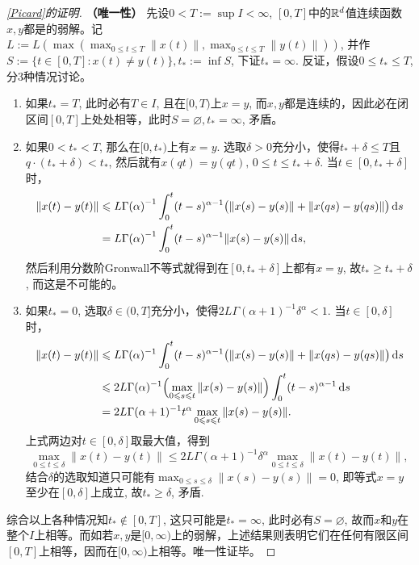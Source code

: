 \begin{proof}[\cref{Picard}的证明]
    \textbf{（唯一性）} 先设$0<T:=\sup I<\infty$, $[0,T]$中的$\mathbb{R}^d$值连续函数$x,y$都是\mainEquation 的弱解。记$L:=L\left(\max\left(\max_{0\leqslant t\leqslant T}\|x(t)\|,\right.\right.\allowbreak\left.\left.\max_{0\leqslant t\leqslant T}\|y(t)\|\right)\right)$, 并作$S:=\{t\in [0,T]\colon x(t)\neq y(t)\},t_*:=\inf S$, 下证$t_*=\infty$. 反证，假设$0\leqslant t_*\leqslant T$, 分3种情况讨论。
    \begin{enumerate}
        \item 如果$t_*=T$, 此时必有$T\in I$, 且在$[0,T)$上$x=y$, 而$x,y$都是连续的，因此必在闭区间$[0,T]$上处处相等，此时$S=\varnothing,t_*=\infty$, 矛盾。
        \item 如果$0<t_*<T$, 那么在$[0,t_*)$上有$x=y$. 选取$\delta>0$充分小，使得$t_*+\delta\leqslant T$且$q\cdot (t_*+\delta)<t_*$, 然后就有$x(qt)=y(qt),\,0\leqslant t\leqslant t_*+\delta$. 当$t\in \left[0,t_*+\delta\right]$时，
        \begin{align*}
            \left\| x(t) - y(t) \right\| &\leqslant {L}{\Gamma(\alpha)}^{-1} \int_0^t (t-s)^{\alpha-1} \bigl(\|x(s)-y(s)\|+\|x(qs)-y(qs)\|\bigr) \mathop{}\!\mathrm{d} s\\
            &={L}{\Gamma(\alpha)}^{-1} \int_0^t (t-s)^{\alpha-1} \|x(s)-y(s)\| \mathop{}\!\mathrm{d} s,
        \end{align*}
        然后利用分数阶Gronwall不等式\cite{mild}就得到在$\left[0,t_*+\delta\right]$上都有$x=y$, 故$t_*\geqslant t_*+\delta$, 而这是不可能的。
        \item 如果$t_*=0$, 选取$\delta\in (0,T]$充分小，使得$2L\Gamma(\alpha+1)^{-1}\delta^\alpha<1$. 当$t\in[0,\delta]$时，
        \begin{align*}
            \left\| x(t) - y(t) \right\| &\leqslant L\Gamma(\alpha)^{-1}\int_0^t (t-s)^{\alpha-1} \bigl(\|x(s)-y(s)\|+\|x(qs)-y(qs)\|\bigr) \mathop{}\!\mathrm{d} s\\
            &\leqslant 2L\Gamma(\alpha)^{-1} \Bigl(\max_{0\leqslant s\leqslant t}\|x(s)-y(s)\|\Bigr) \int_0^t (t-s)^{\alpha-1} \mathop{}\!\mathrm{d} s\\
            &=2L\Gamma(\alpha+1)^{-1}t^\alpha \max_{0\leqslant s\leqslant t}\|x(s)-y(s)\|.
        \end{align*}
        上式两边对$t\in[0,\delta]$取最大值，得到
        \begin{equation*}
            \max_{0\leqslant t\leqslant \delta}\|x(t)-y(t)\|\leqslant 2L\Gamma(\alpha+1)^{-1}\delta^\alpha \max_{0\leqslant t\leqslant \delta}\|x(t)-y(t)\|,
        \end{equation*}
        结合$\delta$的选取知道只可能有$\max_{0\leqslant s\leqslant \delta}\|x(s)-y(s)\|=0$, 即等式$x=y$至少在$[0,\delta]$上成立, 故$t_*\geqslant \delta$, 矛盾.
    \end{enumerate}
    综合以上各种情况知$t_*\notin [0,T]$, 这只可能是$t_*=\infty$, 此时必有$S=\varnothing$, 故而$x$和$y$在整个$I$上相等。而如若$x,y$是$[0,\infty)$上\mainEquation 的弱解，上述结果则表明它们在任何有限区间$[0,T]$上相等，因而在$[0,\infty)$上相等。唯一性证毕。
\end{proof}

